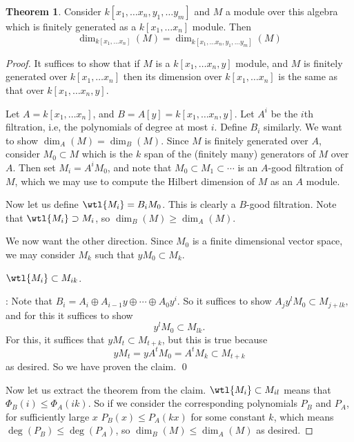 \documentclass[12 pt]{article}
\theoremstyle{definition}
\newtheorem{theorem}{Theorem}[section]
\begin{document}
\begin{theorem} Consider $k[x_1, \ldots x_n, y_1, \ldots y_m]$ and $M$ a module over this algebra which is finitely generated as a $k[x_1, \ldots x_n]$ module. Then
\[\dim_{k[x_1, \ldots x_n]}(M)=\dim_{k[x_1, \ldots x_n, y_1, \ldots y_m]}(M)\]

\label{hilbdimwelldef}

\end{theorem}
\begin{proof}
It suffices to show that if $M$ is a $k[x_1, \ldots x_n,y]$ module, and $M$ is finitely generated over $k[x_1, \ldots x_n]$ then its dimension over $k[x_1, \ldots x_n]$ is the same as that over $k[x_1, \ldots x_n,y]$.

Let $A=k[x_1, \ldots x_n]$, and $B=A[y]=k[x_1, \ldots x_n,y]$. Let $A^i$ be the $i$th filtration, i.e, the polynomials of degree at most $i$. Define $B_i$ similarly. We want to show $\dim_A(M)=\dim_B(M)$. Since $M$ is finitely generated over $A$, consider $M_0 \subset M$ which is the $k$ span of the (finitely many) generators of $M$ over $A$. Then set $M_i=A^iM_0$, and note that $M_0 \subset M_1 \subset \cdots$ is an $A$-good filtration of $M$, which we may use to compute the Hilbert dimension of $M$ as an $A$ module.

Now let us define $\wtl{M_i}=B_iM_0$. This is clearly a $B$-good filtration. Note that $\wtl{M_i} \supset M_i$, so $\dim_B(M) \geq \dim_A(M)$.

We now want the other direction. Since $M_0$ is a finite dimensional vector space, we may consider $M_k$ such that $yM_0 \subset M_k$.

 $\wtl{M_i} \subset M_{ik}$.

: Note that $B_i=A_i \oplus A_{i-1}y \oplus \cdots \oplus A_0y^i$. So it suffices to show $A_jy^lM_0 \subset M_{j+lk},$ and for this it suffices to show
\[y^lM_0 \subset M_{lk}.\]
For this, it suffices that $yM_t \subset M_{t+k}$, but this is true because
\[yM_t=yA^tM_0=A^tM_k \subset M_{t+k}\]
as desired. So we have proven the claim. \qed

Now let us extract the theorem from the claim. $\wtl{M_i} \subset M_{il}$ means that $\Phi_B(i) \leq \Phi_A(ik)$. So if we consider the corresponding polynomials $P_B$ and $P_A$, for sufficiently large $x$ $P_B(x) \leq P_A(kx)$ for some constant $k$, which means $\deg(P_B) \leq \deg(P_A)$, so $\dim_B(M) \leq \dim_A(M)$ as desired.

\end{proof}
\end{document}
